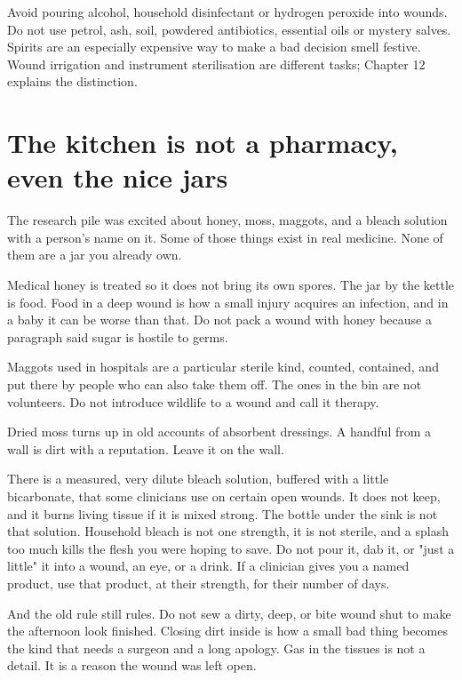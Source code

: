 \documentclass[10pt,openright]{book}
\begin{document}
Avoid pouring alcohol, household disinfectant or hydrogen peroxide into wounds. Do not use petrol, ash, soil, powdered antibiotics, essential oils or mystery salves. Spirits are an especially expensive way to make a bad decision smell festive. Wound irrigation and instrument sterilisation are different tasks; Chapter 12 explains the distinction.

\section*{The kitchen is not a pharmacy, even the nice jars}
The research pile was excited about honey, moss, maggots, and a bleach solution with a person's name on it. Some of those things exist in real medicine. None of them are a jar you already own.

Medical honey is treated so it does not bring its own spores. The jar by the kettle is food. Food in a deep wound is how a small injury acquires an infection, and in a baby it can be worse than that. Do not pack a wound with honey because a paragraph said sugar is hostile to germs.

Maggots used in hospitals are a particular sterile kind, counted, contained, and put there by people who can also take them off. The ones in the bin are not volunteers. Do not introduce wildlife to a wound and call it therapy.

Dried moss turns up in old accounts of absorbent dressings. A handful from a wall is dirt with a reputation. Leave it on the wall.

There is a measured, very dilute bleach solution, buffered with a little bicarbonate, that some clinicians use on certain open wounds. It does not keep, and it burns living tissue if it is mixed strong. The bottle under the sink is not that solution. Household bleach is not one strength, it is not sterile, and a splash too much kills the flesh you were hoping to save. Do not pour it, dab it, or "just a little" it into a wound, an eye, or a drink. If a clinician gives you a named product, use that product, at their strength, for their number of days.

And the old rule still rules. Do not sew a dirty, deep, or bite wound shut to make the afternoon look finished. Closing dirt inside is how a small bad thing becomes the kind that needs a surgeon and a long apology. Gas in the tissues is not a detail. It is a reason the wound was left open.
\end{document}
